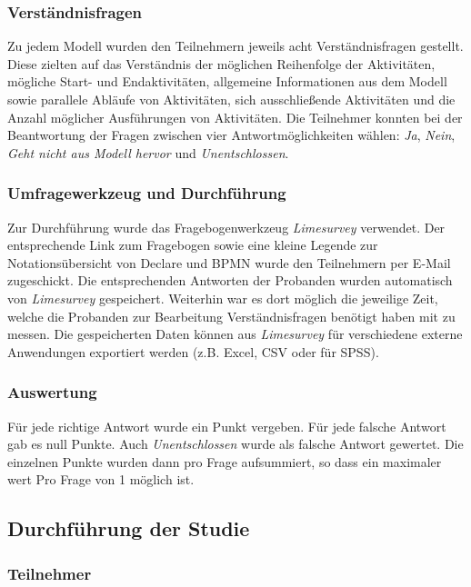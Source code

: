 \subsubsection{Verständnisfragen}

Zu jedem Modell wurden den Teilnehmern jeweils acht Verständnisfragen gestellt. Diese zielten auf das Verständnis der möglichen Reihenfolge der Aktivitäten, mögliche Start- und Endaktivitäten, allgemeine Informationen aus dem Modell sowie parallele Abläufe von Aktivitäten, sich ausschließende Aktivitäten und die Anzahl möglicher Ausführungen von Aktivitäten.\newline
Die Teilnehmer konnten bei der Beantwortung der Fragen zwischen vier Antwortmöglichkeiten wählen: \textit{Ja}, \textit{Nein}, \textit{Geht nicht aus Modell hervor} und \textit{Unentschlossen}.

\subsubsection{Umfragewerkzeug und Durchführung}

Zur Durchführung wurde das Fragebogenwerkzeug \textit{Limesurvey} verwendet. Der entsprechende Link zum Fragebogen sowie eine kleine Legende zur Notationsübersicht von Declare und BPMN wurde den Teilnehmern per E-Mail zugeschickt. Die entsprechenden Antworten der Probanden wurden automatisch von \textit{Limesurvey} gespeichert. Weiterhin war es dort möglich die jeweilige Zeit, welche die Probanden zur Bearbeitung Verständnisfragen benötigt haben mit zu messen. Die gespeicherten Daten können aus \textit{Limesurvey} für verschiedene externe Anwendungen exportiert werden (z.B. Excel, CSV oder für SPSS).

\subsubsection{Auswertung}

Für jede richtige Antwort wurde ein Punkt vergeben. Für jede falsche Antwort gab es null Punkte. Auch \textit{Unentschlossen} wurde als falsche Antwort gewertet. Die einzelnen Punkte wurden dann pro Frage aufsummiert, so dass ein maximaler wert Pro Frage von 1 möglich ist.

\subsection{Durchführung der Studie}

\subsubsection{Teilnehmer}

